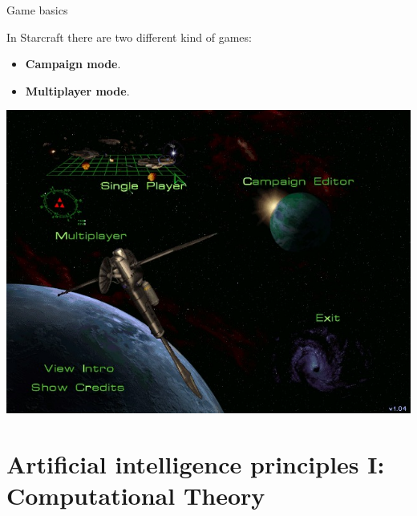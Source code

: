 \documentclass[10pt]{beamer}
\begin{document}
\begin{frame}{Game basics}

In Starcraft there are two different kind of games:

    \begin{itemize}
     \item \textbf{Campaign mode}.

    \item \textbf{Multiplayer mode}.
    \end{itemize}

\begin{center}
	  \includegraphics[scale=0.3]{menu.jpg}
\end{center}
\end{frame}

\section{Artificial intelligence principles I: Computational Theory}
\end{document}
